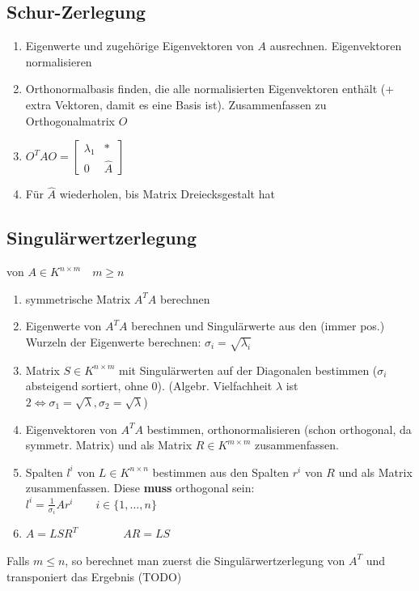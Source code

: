 \documentclass[german, fourcolumn, 8pt]{latex4ei/latex4ei_sheet}
\begin{document}
\begin{sectionbox}
    \subsection{Schur-Zerlegung}
    \begin{enumerate}
        \item Eigenwerte und zugehörige Eigenvektoren von $A$ ausrechnen. Eigenvektoren normalisieren
        \item Orthonormalbasis finden, die alle normalisierten Eigenvektoren enthält (+ extra Vektoren, damit es eine Basis ist). Zusammenfassen zu Orthogonalmatrix $O$
        \item $O^T A O=\begin{bmatrix}
                      \lambda_1 & * \\ 0 & \hat A
                  \end{bmatrix}$
        \item Für $\hat A$ wiederholen, bis Matrix Dreiecksgestalt hat
    \end{enumerate}

\end{sectionbox}
\begin{sectionbox}
    \subsection{Singulärwertzerlegung}
    von $A\in K^{n\times m} \quad m \ge n$
    \begin{enumerate}
        \item symmetrische Matrix $A^T A$ berechnen
        \item Eigenwerte von $A^TA$ berechnen und Singulärwerte aus den (immer pos.) Wurzeln der Eigenwerte berechnen: $\sigma_i = \sqrt{\lambda_i}$
        \item Matrix $S \in K^{n\times m}$ mit Singulärwerten auf der Diagonalen bestimmen ($\sigma_i$ absteigend sortiert, ohne $0$). (Algebr. Vielfachheit $\lambda$ ist $2 \Leftrightarrow \sigma_1=\sqrt \lambda, \sigma_2=\sqrt \lambda$)
        \item Eigenvektoren von $A^TA$ bestimmen, orthonormalisieren (schon orthogonal, da symmetr. Matrix) und als Matrix $R\in K^{m\times m}$ zusammenfassen.
        \item Spalten $l^i$ von $L \in K^{n\times n}$ bestimmen aus den Spalten $r^i$ von $R$ und als Matrix zusammenfassen. Diese \textbf{muss} orthogonal sein: \\
              $l^i=\frac{1}{\sigma_i}Ar^i \qquad i\in \{1,\dots,n\}$
        \item $A=LSR^T \qquad \qquad AR=LS$
    \end{enumerate}
    Falls $m \le n$, so berechnet man zuerst die Singulärwertzerlegung von $A^T$ und transponiert das Ergebnis (TODO)
\end{sectionbox}
\end{document}
